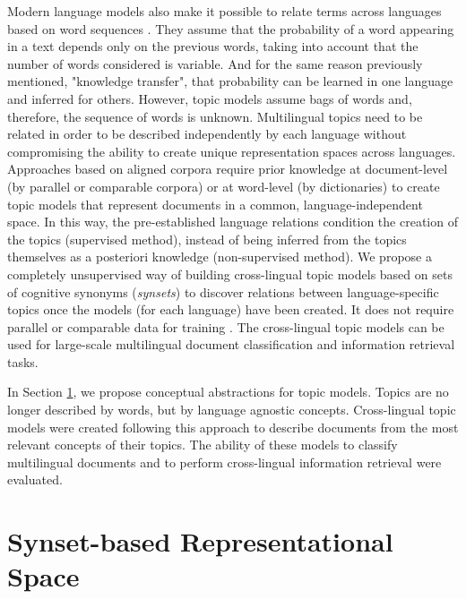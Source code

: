 Modern language models also make it possible to relate terms across languages based on word sequences \citep{Kaliyar2020}. They assume that the probability of a word appearing in a text depends only on the previous words, taking into account that the number of words considered is variable. And for the same reason previously mentioned, "knowledge transfer", that probability can be learned in one language and inferred for others. However, topic models assume bags of words and, therefore, the sequence of words is unknown. Multilingual topics need to be related in order to be described independently by each language without compromising the ability to create unique representation spaces across languages. Approaches based on aligned corpora require prior knowledge at document-level (by parallel or comparable corpora) or at word-level (by dictionaries) to create topic models that represent documents in a common, language-independent space. In this way, the pre-established language relations condition the creation of the topics (supervised method), instead of being inferred from the topics themselves as a posteriori knowledge (non-supervised method). We propose a completely unsupervised way of building cross-lingual topic models based on sets of cognitive synonyms (\textit{synsets}) to discover relations between language-specific topics once the models (for each language) have been created. It does not require parallel or comparable data for training \citep{Badenes-Olmedo2019, Badenes-Olmedo2019b}. The cross-lingual topic models can be used for large-scale multilingual document classification and information retrieval tasks.

In Section \ref{sec:synset-space}, we propose conceptual abstractions for topic models. Topics are no longer described by words, but by language agnostic concepts. Cross-lingual topic models were created following this approach to describe documents from the most relevant concepts of their topics. The ability of these models to classify multilingual documents and to perform cross-lingual information retrieval were evaluated.

\section{Synset-based Representational Space}
\label{sec:synset-space}


